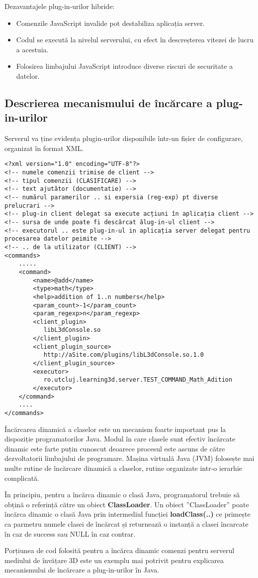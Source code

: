 \par Dezavantajele plug-in-urilor hibride:
\begin{itemize}
\item Comenzile JavaScript invalide pot destabiliza aplicația server.
\item Codul se execută la nivelul serverului, cu efect în descreșterea vitezei de lucru a acestuia.
\item Folosirea limbajului JavaScript introduce diverse riscuri de securitate a datelor.
\end{itemize}



\subsection{Descrierea mecanismului de încărcare a plug-in-urilor}

\par Serverul va ține evidența plugin-urilor disponibile într-un fișier de configurare, organizat în format XML.
\begin{verbatim}
<?xml version="1.0" encoding="UTF-8"?>
<!-- numele comenzii trimise de client -->
<!-- tipul comenzii (CLASIFICARE) -->
<!-- text ajutător (documentatie) -->
<!-- numărul paramerilor .. si expersia (reg-exp) pt diverse prelucrari -->
<!-- plug-in client delegat sa execute acțiuni în aplicația client -->
<!-- sursa de unde poate fi descărcat ălug-in-ul client -->
<!-- executorul .. este plug-in-ul in aplicația server delegat pentru procesarea datelor peimite -->
<!-- .. de la utilizator (CLIENT) -->
<commands>
	.....
	<command>
		<name>@add</name>
		<type>math</type>
		<help>addition of 1..n numbers</help>
		<param_count>-1</param_count>
		<param_regexp>n</param_regexp>
		<client_plugin>
		   libL3dConsole.so
		</client_plugin>
		<client_plugin_source>
		   http://aSite.com/plugins/libL3dConsole.so.1.0
		</client_plugin_source>
		<executor>
		   ro.utcluj.learning3d.server.TEST_COMMAND_Math_Adition
		</executor>
	</command>
	....
</commands>
\end{verbatim} 

\par Încărcarea dinamică a claselor este un mecanism foarte important pus la dispoziție programatorilor Java. Modul în care clasele sunt efectiv încărcate dinamic este farte puțin cunoscut deoarece procesul este ascuns de către dezvoltatorii limbajului de programare. Mașina virtuală Java (JVM) folosește mai multe rutine de încărcare dinamică a claselor, rutine organizate intr-o ierarhie complicată.
\par În principiu, pentru a încărca dinamic o clasă Java, programatorul trebuie să obțină o referință către un obiect \textbf{ClassLoader}. Un obiect ”ClassLoader” poate încărca dinamic o clasă Java prin intermediul funcției \textbf{loadClass(..)} ce primește ca parmetru numele clasei de încărcat și returnează o instanță a clasei încarcate în caz de success sau NULL în caz contrar.
\par Porțiunea de cod folosită pentru a încărca dinamic comenzi pentru serverul mediului de învățare 3D este un exemplu mai potrivit pentru explicarea mecanismului de încărcare a plug-in-urilor în Java.

